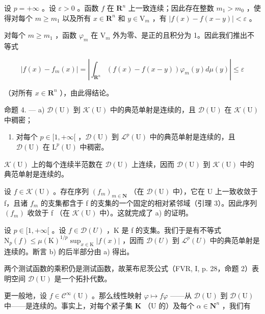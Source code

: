 设 \(p = +\infty\) 。设 \(\varepsilon > 0\) 。函数 \(f\) 在 \(\mathbf{R}^n\) 上一致连续；因此存在整数 \(m_1 > m_0\) ，使得对每个 \(m \geqslant m_1\) 以及所有 \(x \in \mathbf{R}^n\) 和 \(y \in \mathrm{V}_m\) ，有 \(|f(x) - f(x - y)| < \varepsilon\) 。

对每个 \(m \geqslant m_{1}\) ，函数 \(\varphi_{m}\) 在 \(\mathrm{V}_{m}\) 外为零、是正的且积分为 1。因此我们推出不等式

\[
| f (x) - f _ {m} (x) | = \left| \int_ {\mathbf {R} ^ {n}} (f (x) - f (x - y)) \varphi_ {m} (y) d \mu (y) \right| \leqslant \varepsilon
\]

（对所有 \(x \in \mathbf{R}^{n}\) ），由此得结论。

命题 4. --- a) \(\mathcal{D}(\mathrm{U})\) 到 \(\mathcal{K}(\mathrm{U})\) 中的典范单射是连续的，且 \(\mathcal{D}(\mathrm{U})\) 在 \(\mathcal{K}(\mathrm{U})\) 中稠密；

\begin{enumerate}
\def\labelenumi{\alph{enumi})}
\setcounter{enumi}{1}
\tightlist
\item
  对每个 \(p \in [1, +\infty[\) ，\(\mathcal{D}(\mathrm{U})\) 到 \(\mathcal{L}^p(\mathrm{U})\) 中的典范单射是连续的，且 \(\mathcal{D}(\mathrm{U})\) 在 \(\mathrm{L}^p(\mathrm{U})\) 中稠密。
\end{enumerate}

\(\mathcal{K}(\mathrm{U})\) 上的每个连续半范数在 \(\mathcal{D}(\mathrm{U})\) 上连续，因而 \(\mathcal{D}(\mathrm{U})\) 到 \(\mathcal{K}(\mathrm{U})\) 中的典范单射是连续的。

设 \(f \in \mathcal{K}(\mathrm{U})\) 。存在序列 \((f_{m})_{m \in \mathbf{N}}\) （在 \(\mathcal{D}(\mathrm{U})\) 中），它在 U 上一致收敛于 f，且诸 \(f_{m}\) 的支集都含于 f 的支集的一个固定的相对紧邻域（引理 3）。因此序列 \((f_{m})\) 收敛于 f （在 \(\mathcal{K}(\mathrm{U})\) 中）。这就完成了 a) 的证明。

设 \(p \in [1, +\infty[\) 。设 \(f \in \mathcal{D}(U)\) ，K 是 f 的支集。我们于是有不等式 \(\mathrm{N}_{p}(f) \leqslant \mu(\mathrm{K})^{1/p} \sup_{x \in \mathrm{K}} |f(x)|\) ，因而 \(\mathcal{D}(U)\) 到 \(\mathcal{L}^{p}(U)\) 中的典范单射是连续的。断言 b) 的后半部分由 a) 得出。

两个测试函数的乘积仍是测试函数，故莱布尼茨公式（FVR, I, p. 28，命题 2）表明空间 \(\mathcal{D}(\mathrm{U})\) 是一个拓扑代数。

更一般地，设 \(f \in \mathcal{C}^{\infty}(\mathrm{U})\) 。那么线性映射 \(\varphi \mapsto f\varphi\) ——从 \(\mathcal{D}(\mathrm{U})\) 到 \(\mathcal{D}(\mathrm{U})\) 中——是连续的。事实上，对每个紧子集 \(\mathbf{K}\) （\(\mathrm{U}\) 的）及每个 \(\alpha \in \mathbf{N}^{n}\) ，我们有

